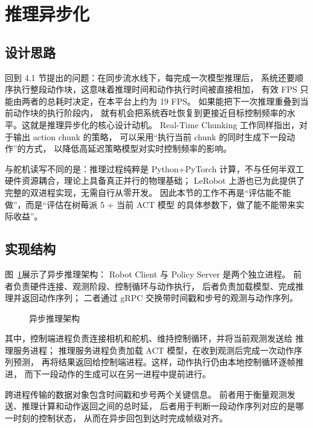 \section{推理异步化}\label{sec:async-inference}

\subsection{设计思路}\label{sec:async-inf-motivation}

回到 4.1 节提出的问题：在同步流水线下，每完成一次模型推理后，
系统还要顺序执行整段动作块，这意味着推理时间和动作执行时间被直接相加，
有效 FPS 只能由两者的总耗时决定，在本平台上约为 19 FPS。
如果能把下一次推理重叠到当前动作块的执行阶段内，
就有机会把系统吞吐恢复到更接近目标控制频率的水平。这就是推理异步化的核心设计动机。
Real-Time Chunking\cite{realtimechunking} 工作同样指出，对于输出 action chunk 的策略，
可以采用``执行当前 chunk 的同时生成下一段动作''的方式，
以降低高延迟策略模型对实时控制频率的影响。

与舵机读写不同的是：推理过程纯粹是 Python+PyTorch
计算，不与任何半双工硬件资源耦合，理论上具备真正并行的物理基础；
LeRobot 上游也已为此提供了完整的双进程实现\cite{smolvla}，无需自行从零开发。
因此本节的工作不再是``评估能不能做''，而是``评估在树莓派 5 + 当前 ACT 模型
的具体参数下，做了能不能带来实际收益''。

\subsection{实现结构}\label{sec:async-inf-arch}

图~\ref{fig:async-inf-arch}展示了异步推理架构：
Robot Client 与 Policy Server 是两个独立进程。
前者负责硬件连接、观测阶段、控制循环与动作执行，
后者负责加载模型、完成推理并返回动作序列；
二者通过 gRPC 交换带时间戳和步号的观测与动作序列。

\begin{figure}[htbp]
  \centering
  
  \caption{异步推理架构}
  \label{fig:async-inf-arch}
\end{figure}

其中，控制端进程负责连接相机和舵机、维持控制循环，并将当前观测发送给
推理服务进程；
推理服务进程负责加载 ACT 模型，在收到观测后完成一次动作序列预测，
再将结果返回给控制端进程。这样，动作执行仍由本地控制循环逐帧推进，
而下一段动作的生成可以在另一进程中提前进行。

跨进程传输的数据对象包含时间戳和步号两个关键信息。
前者用于衡量观测发送、推理计算和动作返回之间的总时延，
后者用于判断一段动作序列对应的是哪一时刻的控制状态，
从而在异步回包到达时完成帧级对齐。

